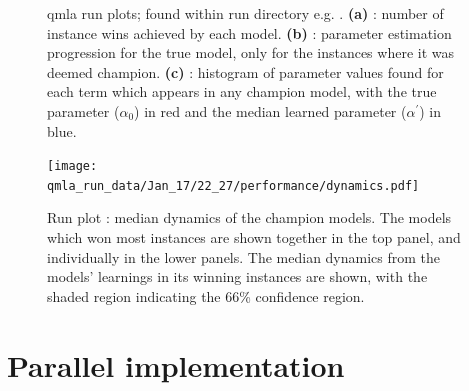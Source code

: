 \begin{figure}[H]
    \begin{center}
        \qquad
        \qquad
    \end{center}
    \caption[Run plots]{
        \gls{qmla} run plots; found within run directory e.g. . 
        \textbf{(a)} : number of instance wins achieved by each model. 
        \textbf{(b)} : 
            parameter estimation progression for the true model, only for the instances where it was deemed champion. 
        \textbf{(c)} : 
            histogram of parameter values found for each term which appears in any champion model,
            with the true parameter ($\alpha_0$) in red and the median learned parameter ($\alpha^{\prime}$) in blue.
    }
    \label{fig:run_plots}
\end{figure}

\begin{figure}[H]
    \begin{center}
        \texttt{[image: qmla\_run\_data/Jan\_17/22\_27/performance/dynamics.pdf]}
    \end{center}
    \caption{
        Run plot : median dynamics of the champion models. 
        The models which won most instances are shown together in the top panel, 
        and individually in the lower panels. 
        The median dynamics from the models' learnings in its winning instances are shown, 
        with the shaded region indicating the 66\% confidence region. 
    }
    \label{fig:run_dynamics}
\end{figure}



\section{Parallel implementation}



